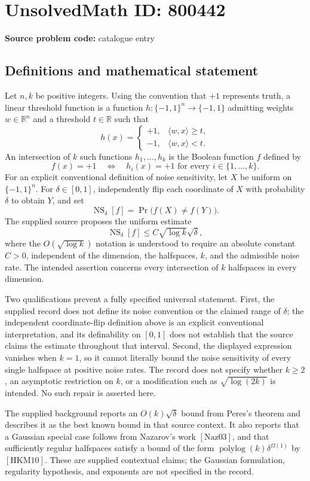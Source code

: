 \documentclass[11pt]{article}
\newcommand{\R}{\mathbb{R}}
\begin{document}
\section*{UnsolvedMath ID: 800442}
\textbf{Source problem code:} catalogue entry
\subsection{Definitions and mathematical statement}
Let \(n,k\) be positive integers. Using the convention that \(+1\) represents truth, a linear threshold function is a function \(h\colon\{-1,1\}^n\to\{-1,1\}\) admitting weights \(w\in\R^n\) and a threshold \(t\in\R\) such that
\[
h(x)=\begin{cases}+1,&\langle w,x\rangle\ge t,\\-1,&\langle w,x\rangle<t.\end{cases}
\]
An intersection of \(k\) such functions \(h_1,\ldots,h_k\) is the Boolean function \(f\) defined by
\[
f(x)=+1\quad\Longleftrightarrow\quad h_i(x)=+1\text{ for every }i\in\{1,\ldots,k\}.
\]
For an explicit conventional definition of noise sensitivity, let \(X\) be uniform on \(\{-1,1\}^n\). For \(\delta\in[0,1]\), independently flip each coordinate of \(X\) with probability \(\delta\) to obtain \(Y\), and set
\[
\operatorname{NS}_{\delta}[f]=\Pr\bigl(f(X)\ne f(Y)\bigr).
\]
The supplied source proposes the uniform estimate
\[
\operatorname{NS}_{\delta}[f]\le C\sqrt{\log k}\sqrt{\delta},
\]
where the \(O(\sqrt{\log k})\) notation is understood to require an absolute constant \(C>0\), independent of the dimension, the halfspaces, \(k\), and the admissible noise rate. The intended assertion concerns every intersection of \(k\) halfspaces in every dimension.

Two qualifications prevent a fully specified universal statement. First, the supplied record does not define its noise convention or the claimed range of \(\delta\); the independent coordinate-flip definition above is an explicit conventional interpretation, and its definability on \([0,1]\) does not establish that the source claims the estimate throughout that interval. Second, the displayed expression vanishes when \(k=1\), so it cannot literally bound the noise sensitivity of every single halfspace at positive noise rates. The record does not specify whether \(k\ge2\), an asymptotic restriction on \(k\), or a modification such as \(\sqrt{\log(2k)}\) is intended. No such repair is asserted here.

The supplied background reports an \(O(k)\sqrt{\delta}\) bound from Peres's theorem and describes it as the best known bound in that source context. It also reports that a Gaussian special case follows from Nazarov's work \([\mathrm{Naz03}]\), and that sufficiently regular halfspaces satisfy a bound of the form \(\operatorname{polylog}(k)\delta^{\Omega(1)}\) by \([\mathrm{HKM10}]\). These are supplied contextual claims; the Gaussian formulation, regularity hypothesis, and exponents are not specified in the record.
\end{document}
